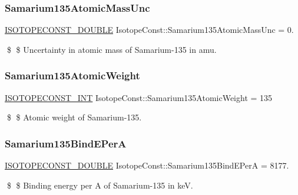 \subsubsection{\texorpdfstring{Samarium135\+Atomic\+Mass\+Unc}{Samarium135AtomicMassUnc}}
{\footnotesize\ttfamily \mbox{\hyperlink{group___isotope_const-_macros_ga8f45a7272ce02c0b4c65c44636ed719a}{I\+S\+O\+T\+O\+P\+E\+C\+O\+N\+S\+T\+\_\+\+D\+O\+U\+B\+LE}} Isotope\+Const\+::\+Samarium135\+Atomic\+Mass\+Unc = 0.}

\$ \$ Uncertainty in atomic mass of Samarium-\/135 in amu. \mbox{\label{group___isotope_const-_samarium-_sm135_ga8e63eba01064169af54d27a79b3b682c}} 
\subsubsection{\texorpdfstring{Samarium135\+Atomic\+Weight}{Samarium135AtomicWeight}}
{\footnotesize\ttfamily \mbox{\hyperlink{group___isotope_const-_macros_ga5f18360b3e99483a35c32d789e62621c}{I\+S\+O\+T\+O\+P\+E\+C\+O\+N\+S\+T\+\_\+\+I\+NT}} Isotope\+Const\+::\+Samarium135\+Atomic\+Weight = 135}

\$ \$ Atomic weight of Samarium-\/135. \mbox{\label{group___isotope_const-_samarium-_sm135_ga8caf6524f40d4259cb5bb04f8f633df8}} 
\subsubsection{\texorpdfstring{Samarium135\+Bind\+E\+PerA}{Samarium135BindEPerA}}
{\footnotesize\ttfamily \mbox{\hyperlink{group___isotope_const-_macros_ga8f45a7272ce02c0b4c65c44636ed719a}{I\+S\+O\+T\+O\+P\+E\+C\+O\+N\+S\+T\+\_\+\+D\+O\+U\+B\+LE}} Isotope\+Const\+::\+Samarium135\+Bind\+E\+PerA = 8177.}

\$ \$ Binding energy per A of Samarium-\/135 in keV. \mbox{\label{group___isotope_const-_samarium-_sm135_gacf9087421a739e8e886796a330399992}} 
